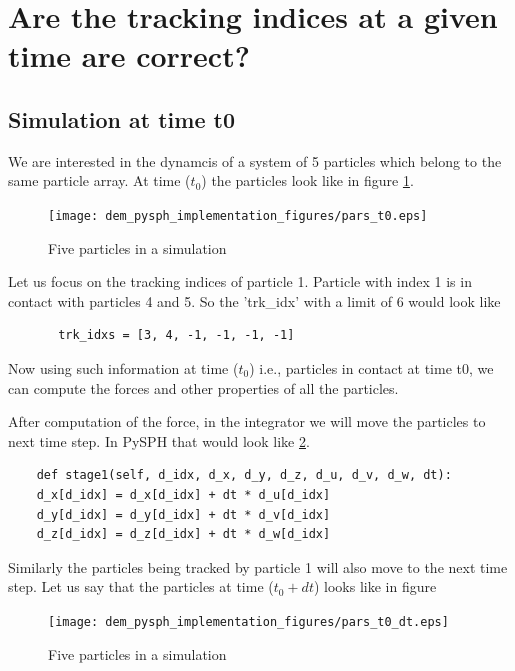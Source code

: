 \documentclass[11pt]{article}
\begin{document}
\section{Are the tracking indices at a given time are correct?}
\label{sec:orgadd918e}

\subsection{Simulation at time t0}
\label{sec:org2a399eb}
We are interested in the dynamcis of a system of 5 particles which belong to
the same particle array. At time (\(t_0\)) the particles look like in figure
\ref{fig:pars_t0_sim}.

\begin{figure}[H]
\centering
\texttt{[image: dem\_pysph\_implementation\_figures/pars\_t0.eps]}
\caption{Five particles in a simulation\label{fig:pars_t0_sim}}
\end{figure}

Let us focus on the tracking indices of particle 1. Particle with index 1 is
in contact with particles 4 and 5. So the 'trk\_idx' with a limit of 6 would
look like

\begin{verbatim}
       trk_idxs = [3, 4, -1, -1, -1, -1]
\end{verbatim}

Now using such information at time (\(t_0\)) i.e., particles in contact at time t0, we
can compute the forces and other properties of all the particles.

After computation of the force, in the integrator we will move the particles
to next time step. In PySPH that would look like \ref{fig:pars_t0_dt_sim}.
\begin{verbatim}
	def stage1(self, d_idx, d_x, d_y, d_z, d_u, d_v, d_w, dt):
	d_x[d_idx] = d_x[d_idx] + dt * d_u[d_idx]
	d_y[d_idx] = d_y[d_idx] + dt * d_v[d_idx]
	d_z[d_idx] = d_z[d_idx] + dt * d_w[d_idx]
\end{verbatim}

Similarly the particles being tracked by particle 1 will also move to the next
time step. Let us say that the particles at time (\(t_0+dt\)) looks like in figure


\begin{figure}[H]
\centering
\texttt{[image: dem\_pysph\_implementation\_figures/pars\_t0\_dt.eps]}
\caption{Five particles in a simulation\label{fig:pars_t0_dt_sim}}
\end{figure}
\end{document}
